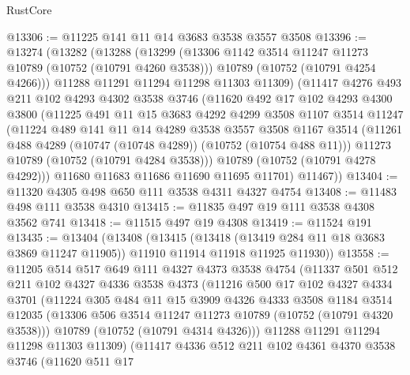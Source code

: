 \begin{lexlean}{RustCore}
\begin{coremodule}
@13306 := @11225 @141 @11 @14 @3683 @3538 @3557 @3508
@13396 := @13274
    (@13282
      (@13288
        (@13299
          (@13306 @1142 @3514 @11247 @11273 @10789 (@10752 (@10791 @4260 @3538)))
          @10789
          (@10752 (@10791 @4254 @4266)))
        @11288
        @11291
        @11294
        @11298
        @11303
        @11309)
      (@11417
        @4276
        @493
        @211
        @102
        @4293
        @4302
        @3538
        @3746
        (@11620
          @492
          @17
          @102
          @4293
          @4300
          @3800
          (@11225
            @491
            @11
            @15
            @3683
            @4292
            @4299
            @3508
            @1107
            @3514
            @11247
            (@11224
              @489
              @141
              @11
              @14
              @4289
              @3538
              @3557
              @3508
              @1167
              @3514
              (@11261 @488 @4289 (@10747 (@10748 @4289)) (@10752 (@10754 @488 @11)))
              @11273
              @10789
              (@10752 (@10791 @4284 @3538)))
            @10789
            (@10752 (@10791 @4278 @4292)))
          @11680
          @11683
          @11686
          @11690
          @11695
          @11701)
        @11467))
@13404 := @11320 @4305 @498 @650 @111 @3538 @4311 @4327 @4754
@13408 := @11483 @498 @111 @3538 @4310
@13415 := @11835 @497 @19 @111 @3538 @4308 @3562 @741
@13418 := @11515 @497 @19 @4308
@13419 := @11524 @191
@13435 := @13404
    (@13408
      (@13415
        (@13418 (@13419 @284 @11 @18 @3683 @3869 @11247 @11905))
        @11910
        @11914
        @11918
        @11925
        @11930))
@13558 := @11205
    @514
    @517
    @649
    @111
    @4327
    @4373
    @3538
    @4754
    (@11337
      @501
      @512
      @211
      @102
      @4327
      @4336
      @3538
      @4373
      (@11216
        @500
        @17
        @102
        @4327
        @4334
        @3701
        (@11224
          @305
          @484
          @11
          @15
          @3909
          @4326
          @4333
          @3508
          @1184
          @3514
          @12035
          (@13306 @506 @3514 @11247 @11273 @10789 (@10752 (@10791 @4320 @3538)))
          @10789
          (@10752 (@10791 @4314 @4326)))
        @11288
        @11291
        @11294
        @11298
        @11303
        @11309)
      (@11417
        @4336
        @512
        @211
        @102
        @4361
        @4370
        @3538
        @3746
        (@11620
          @511
          @17

\end{coremodule}
\end{lexlean}
